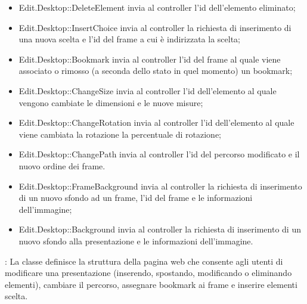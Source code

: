 {{\begin{itemize}
				\item Edit.Desktop::DeleteElement invia al controller l'id dell'elemento eliminato;
				\item Edit.Desktop::InsertChoice invia al controller la richiesta di inserimento di una nuova scelta e l'id del frame a cui è indirizzata la scelta;
				\item Edit.Desktop::Bookmark invia al controller l'id del frame al quale viene associato o rimosso (a seconda dello stato in quel momento) un bookmark;
				\item Edit.Desktop::ChangeSize invia al controller l'id dell'elemento al quale vengono cambiate le dimensioni e le nuove misure;
				\item Edit.Desktop::ChangeRotation invia al controller l'id dell'elemento al quale viene cambiata la rotazione la percentuale di rotazione;
				\item Edit.Desktop::ChangePath invia al controller l'id del percorso modificato e il nuovo ordine dei frame.
				\item Edit.Desktop::FrameBackground invia al controller la richiesta di inserimento di un nuovo sfondo ad un frame, l'id del frame e le informazioni dell'immagine;
				\item Edit.Desktop::Background invia al controller la richiesta di inserimento di un nuovo sfondo alla presentazione e le informazioni dell'immagine.
			\end{itemize}
			\textbf{\attivita}: La classe definisce la struttura della pagina web che consente agli utenti di modificare una presentazione (inserendo, spostando, modificando o eliminando elementi), cambiare il percorso, assegnare bookmark ai frame e inserire elementi scelta.\\
		}
}
